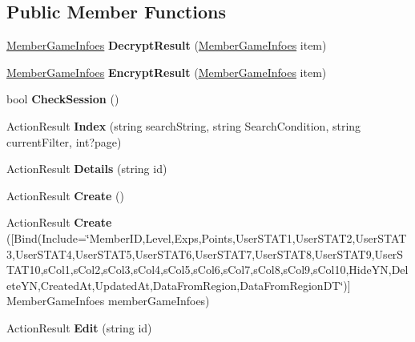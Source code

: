 \subsection*{Public Member Functions}
\begin{DoxyCompactItemize}
\item 
\hyperlink{a00137}{Member\+Game\+Infoes} {\bfseries Decrypt\+Result} (\hyperlink{a00137}{Member\+Game\+Infoes} item)\hypertarget{a00138_a59ae7e581adf00d39d6ab2b6eb3532dc}{}\label{a00138_a59ae7e581adf00d39d6ab2b6eb3532dc}

\item 
\hyperlink{a00137}{Member\+Game\+Infoes} {\bfseries Encrypt\+Result} (\hyperlink{a00137}{Member\+Game\+Infoes} item)\hypertarget{a00138_a88f805c52482a1c0429ce4bdfb209ec7}{}\label{a00138_a88f805c52482a1c0429ce4bdfb209ec7}

\item 
bool {\bfseries Check\+Session} ()\hypertarget{a00138_a971eb9c56633803b2777b3673756c811}{}\label{a00138_a971eb9c56633803b2777b3673756c811}

\item 
Action\+Result {\bfseries Index} (string search\+String, string Search\+Condition, string current\+Filter, int?page)\hypertarget{a00138_a85f1654dae6c92131405203cf5db3772}{}\label{a00138_a85f1654dae6c92131405203cf5db3772}

\item 
Action\+Result {\bfseries Details} (string id)\hypertarget{a00138_a6bf3cb823296474e2e21c02a905a6cdf}{}\label{a00138_a6bf3cb823296474e2e21c02a905a6cdf}

\item 
Action\+Result {\bfseries Create} ()\hypertarget{a00138_a569c95ecd9dbff0a992ad90f838fbf12}{}\label{a00138_a569c95ecd9dbff0a992ad90f838fbf12}

\item 
Action\+Result {\bfseries Create} (\mbox{[}Bind(Include=\char`\"{}Member\+ID,Level,Exps,Points,User\+S\+T\+A\+T1,User\+S\+T\+A\+T2,User\+S\+T\+A\+T3,User\+S\+T\+A\+T4,User\+S\+T\+A\+T5,User\+S\+T\+A\+T6,User\+S\+T\+A\+T7,User\+S\+T\+A\+T8,User\+S\+T\+A\+T9,User\+S\+T\+A\+T10,s\+Col1,s\+Col2,s\+Col3,s\+Col4,s\+Col5,s\+Col6,s\+Col7,s\+Col8,s\+Col9,s\+Col10,Hide\+YN,Delete\+YN,Created\+At,Updated\+At,Data\+From\+Region,Data\+From\+Region\+DT\char`\"{})\mbox{]} Member\+Game\+Infoes member\+Game\+Infoes)\hypertarget{a00138_a607bb5650368e5de0accbb61e39fcffc}{}\label{a00138_a607bb5650368e5de0accbb61e39fcffc}

\item 
Action\+Result {\bfseries Edit} (string id)\hypertarget{a00138_a8d91e3965c0cab0f71d9d6fa8d268ab4}{}\label{a00138_a8d91e3965c0cab0f71d9d6fa8d268ab4}


\end{DoxyCompactItemize}
